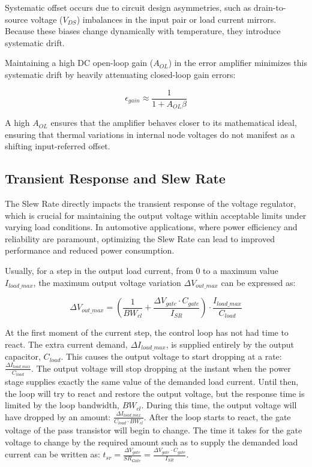 \documentclass[
]{article}
\begin{document}
Systematic offset occurs due to circuit design asymmetries, such as
drain-to-source voltage (\(V_{DS}\)) imbalances in the input pair or
load current mirrors. Because these biases change dynamically with
temperature, they introduce systematic drift.

Maintaining a high DC open-loop gain (\(A_{OL}\)) in the error amplifier
minimizes this systematic drift by heavily attenuating closed-loop gain
errors:

\[\epsilon_{gain} \approx \frac{1}{1 + A_{OL}\beta}\]

A high \(A_{OL}\) ensures that the amplifier behaves closer to its
mathematical ideal, ensuring that thermal variations in internal node
voltages do not manifest as a shifting input-referred offset.

\subsection{Transient Response and Slew
Rate}\label{_transient_response_and_slew_rate}

The Slew Rate directly impacts the transient response of the voltage
regulator, which is crucial for maintaining the output voltage within
acceptable limits under varying load conditions. In automotive
applications, where power efficiency and reliability are paramount,
optimizing the Slew Rate can lead to improved performance and reduced
power consumption.

Usually, for a step in the output load current, from 0 to a maximum
value \(I_{load\_max}\), the maximum output voltage variation
\(\Delta V_{out\_max}\) can be expressed as:

\[\Delta V_{out\_max} = (\frac{1}{BW_{cl}} + \frac{\Delta V_{gate} \cdot C_{gate}}{I_{SR}})\cdot \frac{I_{load\_max}}{C_{load}}\]

At the first moment of the current step, the control loop has not had
time to react. The extra current demand, \(\Delta I_{load\_max}\), is
supplied entirely by the output capacitor, \(C_{load}\). This causes the
output voltage to start dropping at a rate:
\(\frac{\Delta I_{load\_max}}{C_{load}}\). The output voltage will stop
dropping at the instant when the power stage supplies exactly the same
value of the demanded load current. Until then, the loop will try to
react and restore the output voltage, but the response time is limited
by the loop bandwidth, \(BW_{cl}\). During this time, the output voltage
will have dropped by an amount:
\(\frac{\Delta I_{load\_max}}{C_{load} \cdot BW_{cl}}\). After the loop
starts to react, the gate voltage of the pass transistor will begin to
change. The time it takes for the gate voltage to change by the required
amount such as to supply the demanded load current can be written as:
\(t_{sr} = \frac{\Delta V_{gate}}{SR_{Gate}} = \frac{\Delta V_{gate} \cdot C_{gate}}{I_{SR}}\).
\end{document}
